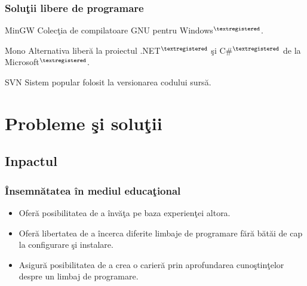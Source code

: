 \documentclass[compress]{beamer}
\begin{document}
\begin{frame}
\frametitle{Solu\c{t}ii libere de programare}

\begin{exampleblock}{MinGW}
Colec\c{t}ia de compilatoare GNU pentru Windows$^{\textregistered}$.
\end{exampleblock}

\pause

\begin{exampleblock}{Mono}
Alternativa liber\u{a} la proiectul .NET$^{\textregistered}$ \c{s}i C\#$^{\textregistered}$ de la Microsoft$^{\textregistered}$.
\end{exampleblock}

\pause

\begin{exampleblock}{SVN}
Sistem popular folosit la versionarea codului surs\u{a}.
\end{exampleblock}

\end{frame}

\section{Probleme \c{s}i solu\c{t}ii}
\subsection{Inpactul}

\begin{frame}
\frametitle{\^{I}nsemn\u{a}tatea \^{i}n mediul educa\c{t}ional}

\begin{itemize}
    \item<1-> Ofer\u{a} posibilitatea de a \^{i}nv\u{a}\c{t}a pe baza experien\c{t}ei altora.
    \item<2-> Ofer\u{a} libertatea de a \^{i}ncerca diferite limbaje de programare f\u{a}r\u{a} b\u{a}t\u{a}i de cap la configurare \c{s}i instalare.
    \item<3-> Asigur\u{a} posibilitatea de a crea o carier\u{a} prin aprofundarea cuno\c{s}tin\c{t}elor despre un limbaj de programare.
\end{itemize}

\end{frame}
\end{document}
